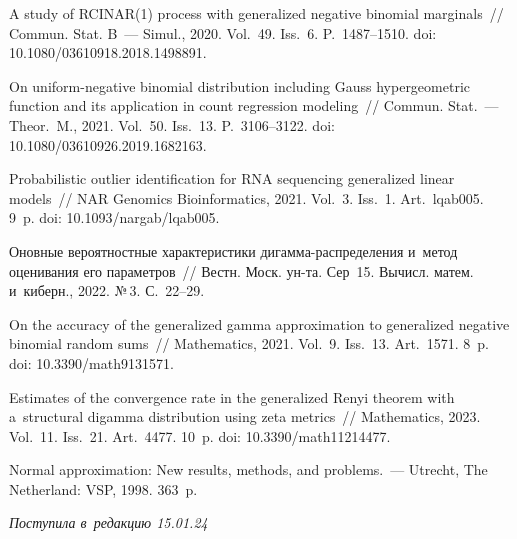 \begin{multicols}{2}
{{\begin{thebibliography}{99}
A study of RCINAR(1) process with generalized negative binomial marginals~// Commun. Stat. B~--- Simul., 2020. Vol.~49. Iss.~6. P.~1487--1510.
doi: 10.1080/03610918.2018.1498891.

On uniform-negative binomial distribution including Gauss hypergeometric 
function and its application in count regression modeling~// Commun. Stat.~--- Theor.~M., 2021. Vol.~50. Iss.~13. P.~3106--3122.
doi: 10.1080/03610926.2019.1682163.

Probabilistic outlier identification for RNA sequencing generalized linear 
models~// NAR Genomics Bioinformatics, 2021. Vol.~3. Iss.~1. Art.~lqab005. 9~p.
doi: 10.1093/nargab/lqab005.

Оновные вероятностные характеристики ди\-гам\-ма-рас\-пре\-де\-ле\-ния и~метод оценивания 
его параметров~// Вестн. Моск. ун-та. Сер~15. Вычисл. матем. и~киберн., 2022. №\,3. 
С.~22--29.

On the accuracy of the generalized gamma approximation to generalized negative 
binomial random sums~// Mathematics, 2021. Vol.~9. Iss.~13. Art.~1571. 8~p. doi: 10.3390/math9131571.

Estimates of the convergence rate in the generalized Renyi theorem with 
a~structural digamma distribution using zeta metrics~// Mathematics, 2023. Vol.~11. Iss.~21. Art.~4477. 10~p. doi: 10.3390/math11214477.

Normal approximation: New results, methods, and problems.~--- Utrecht, The Netherland: VSP, 1998. 363~p.
\end{thebibliography}

 }
 }

\end{multicols}

\vspace*{-10pt}

\hfill{\small\textit{Поступила в~редакцию 15.01.24}}



\newpage

